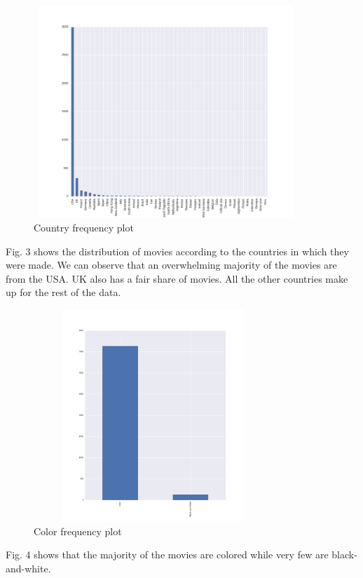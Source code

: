\documentclass[conference]{IEEEtran}
\begin{document}
\begin{figure}[H]
  \centering    
  \captionsetup{justification=centering}
  \includegraphics[height=8cm, width=10cm, trim={20mm 0mm 10mm 20mm},clip]{../visualizations/Country-Histogram.png}
  \caption{Country frequency plot}
  \label{fig:fig3}
\end{figure}
Fig. 3 shows the distribution of movies according to the countries in which they were made. We can observe that an overwhelming majority of the movies are from the USA. UK also has a fair share of movies. All  the other countries make up for the rest of the data.

\begin{figure}[H]
  \centering    
  \captionsetup{justification=centering}
  \includegraphics[height=8cm, width=9cm, trim={30mm 0mm 20mm 0mm},clip]{../visualizations/Colour-Histogram}
  \caption{Color frequency plot}
  \label{fig:fig4}
\end{figure}
Fig. 4 shows that the majority of the movies are colored while very few are black-and-white.
\end{document}
